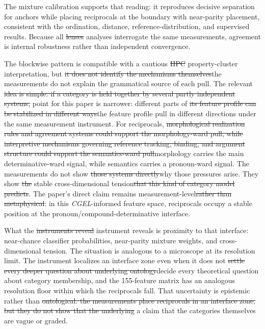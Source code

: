 \documentclass[12pt]{article}
\providecommand{\DIFaddtex}[1]{{\protect\color{DIFgreen}#1}} %
\providecommand{\DIFdeltex}[1]{{\protect\color{red}\sout{#1}}}                      %
\providecommand{\DIFaddbegin}{} %
\providecommand{\DIFaddend}{} %
\providecommand{\DIFdelbegin}{} %
\providecommand{\DIFdelend}{} %
\providecommand{\DIFadd}[1]{\texorpdfstring{\DIFaddtex{#1}}{#1}} %
\providecommand{\DIFdel}[1]{\texorpdfstring{\DIFdeltex{#1}}{}} %
\newcommand{\DIFscaledelfig}{0.5}
\newlength{\DIFdelgraphicswidth} %
\newlength{\DIFdelgraphicsheight} %
\newcommand{\DIFaddincludegraphics}[2][]{{\color{DIFgreen}\fbox{\DIFOincludegraphics[#1]{#2}}}} %
\newcommand{\DIFdelincludegraphics}[2][]{%
\sbox{\DIFdelgraphicsbox}{\DIFOincludegraphics[#1]{#2}}%
\settoboxwidth{\DIFdelgraphicswidth}{\DIFdelgraphicsbox} %
\settoboxtotalheight{\DIFdelgraphicsheight}{\DIFdelgraphicsbox} %
\scalebox{\DIFscaledelfig}{%
\parbox[b]{\DIFdelgraphicswidth}{\usebox{\DIFdelgraphicsbox}\\[-\baselineskip] \rule{\DIFdelgraphicswidth}{0em}}\llap{\resizebox{\DIFdelgraphicswidth}{\DIFdelgraphicsheight}{%
\setlength{\unitlength}{\DIFdelgraphicswidth}%
\begin{picture}(1,1)%
\thicklines\linethickness{2pt} %
{\color[rgb]{1,0,0}\put(0,0){\framebox(1,1){}}}%
{\color[rgb]{1,0,0}\put(0,0){\line( 1,1){1}}}%
{\color[rgb]{1,0,0}\put(0,1){\line(1,-1){1}}}%
\end{picture}%
}\hspace*{3pt}}} %
} %
\DeclareRobustCommand{\DIFaddbegin}{\DIFOaddbegin \let\includegraphics\DIFaddincludegraphics} %
\DeclareRobustCommand{\DIFaddend}{\DIFOaddend \let\includegraphics\DIFOincludegraphics} %
\DeclareRobustCommand{\DIFdelbegin}{\DIFOdelbegin \let\includegraphics\DIFdelincludegraphics} %
\DeclareRobustCommand{\DIFdelend}{\DIFOaddend \let\includegraphics\DIFOincludegraphics} %
\begin{document}
\DIFadd{The mixture calibration supports that reading: it }\DIFaddend reproduces decisive separation for anchors while placing reciprocals at the boundary with near-parity placement, consistent with the ordination, distance, reference-distribution, and supervised results. Because all \DIFdelbegin \DIFdel{lenses }\DIFdelend \DIFaddbegin \DIFadd{analyses }\DIFaddend interrogate the same measurements, agreement is internal robustness rather than independent convergence.

The blockwise pattern is compatible with a cautious \DIFdelbegin \DIFdel{HPC }\DIFdelend \DIFaddbegin \DIFadd{property-cluster }\DIFaddend interpretation, but \DIFdelbegin \DIFdel{it does not identify the mechanisms themselves}\DIFdelend \DIFaddbegin \DIFadd{the measurements do not explain the grammatical source of each pull}\DIFaddend . The relevant \DIFdelbegin \DIFdel{idea is simple: if a category is held together by several partly independent systems, }\DIFdelend \DIFaddbegin \DIFadd{point for this paper is narrower: }\DIFaddend different parts of \DIFdelbegin \DIFdel{its feature profile can be stabilized in different ways}\DIFdelend \DIFaddbegin \DIFadd{the feature profile pull in different directions under the same measurement instrument}\DIFaddend . For reciprocals, \DIFdelbegin \DIFdel{morphological realization rules and agreement systems could support the morphology-ward pull, while interpretive mechanisms governing reference tracking, binding, and argument structure could support the semantics-ward pull}\DIFdelend \DIFaddbegin \DIFadd{morphology carries the main determinative-ward signal, while semantics carries a pronoun-ward signal}\DIFaddend . The measurements do not show \DIFdelbegin \DIFdel{those systems directly}\DIFdelend \DIFaddbegin \DIFadd{why those pressures arise}\DIFaddend . They show \DIFdelbegin \DIFdel{the }\DIFdelend \DIFaddbegin \DIFadd{stable }\DIFaddend cross-dimensional tension\DIFdelbegin \DIFdel{that this kind of category model predicts}\DIFdelend . The paper's direct claim remains measurement-level\DIFdelbegin \DIFdel{rather than metaphysical}\DIFdelend : in this \textit{CGEL}-informed feature space, reciprocals occupy a stable position at the pronoun/compound-determinative interface.

What the \DIFdelbegin \DIFdel{instruments reveal }\DIFdelend \DIFaddbegin \DIFadd{instrument reveals }\DIFaddend is proximity to that interface: near-chance classifier probabilities, near-parity mixture weights, and cross-dimensional tension. The situation is analogous to a microscope at its resolution limit. The instrument localizes an interface zone even when it does not \DIFdelbegin \DIFdel{settle every deeper question about underlying ontology}\DIFdelend \DIFaddbegin \DIFadd{decide every theoretical question about category membership}\DIFaddend , and the 155-feature matrix has an analogous resolution floor within which the reciprocals fall. That uncertainty is epistemic rather than \DIFdelbegin \DIFdel{ontological: the measurements place reciprocals in an interface zone, but they do not show that the underlying }\DIFdelend \DIFaddbegin \DIFadd{a claim that the }\DIFaddend categories themselves are vague or graded.
\end{document}
